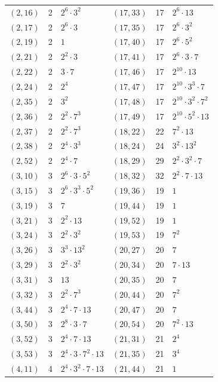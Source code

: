 \documentclass[11pt]{article}
\begin{document}
\begin{longtable}{@{}lrl@{\qquad}lrl@{}}
$(2,16)$ & 2 & $2^{6}\cdot 3^{2}$ & $(17,33)$ & 17 & $2^{6}\cdot 13$\\
$(2,17)$ & 2 & $2^{6}\cdot 3$ & $(17,35)$ & 17 & $2^{6}\cdot 3^{2}$\\
$(2,19)$ & 2 & $1$ & $(17,40)$ & 17 & $2^{6}\cdot 5^{2}$\\
$(2,21)$ & 2 & $2^{2}\cdot 3$ & $(17,41)$ & 17 & $2^{6}\cdot 3\cdot 7$\\
$(2,22)$ & 2 & $3\cdot 7$ & $(17,46)$ & 17 & $2^{10}\cdot 13$\\
$(2,24)$ & 2 & $2^{4}$ & $(17,47)$ & 17 & $2^{10}\cdot 3^{3}\cdot 7$\\
$(2,35)$ & 2 & $3^{2}$ & $(17,48)$ & 17 & $2^{10}\cdot 3^{2}\cdot 7^{2}$\\
$(2,36)$ & 2 & $2^{2}\cdot 7^{3}$ & $(17,49)$ & 17 & $2^{10}\cdot 5^{2}\cdot 13$\\
$(2,37)$ & 2 & $2^{2}\cdot 7^{3}$ & $(18,22)$ & 22 & $7^{2}\cdot 13$\\
$(2,38)$ & 2 & $2^{4}\cdot 3^{3}$ & $(18,24)$ & 24 & $3^{2}\cdot 13^{2}$\\
$(2,52)$ & 2 & $2^{4}\cdot 7$ & $(18,29)$ & 29 & $2^{2}\cdot 3^{2}\cdot 7$\\
$(3,10)$ & 3 & $2^{6}\cdot 3\cdot 5^{2}$ & $(18,32)$ & 32 & $2^{2}\cdot 7\cdot 13$\\
$(3,15)$ & 3 & $2^{6}\cdot 3^{3}\cdot 5^{2}$ & $(19,36)$ & 19 & $1$\\
$(3,19)$ & 3 & $7$ & $(19,44)$ & 19 & $1$\\
$(3,21)$ & 3 & $2^{2}\cdot 13$ & $(19,52)$ & 19 & $1$\\
$(3,24)$ & 3 & $2^{2}\cdot 3^{2}$ & $(19,53)$ & 19 & $7^{2}$\\
$(3,26)$ & 3 & $3^{3}\cdot 13^{2}$ & $(20,27)$ & 20 & $7$\\
$(3,29)$ & 3 & $2^{2}\cdot 3^{2}$ & $(20,34)$ & 20 & $7\cdot 13$\\
$(3,31)$ & 3 & $13$ & $(20,35)$ & 20 & $7$\\
$(3,32)$ & 3 & $2^{2}\cdot 7^{3}$ & $(20,44)$ & 20 & $7^{2}$\\
$(3,44)$ & 3 & $2^{4}\cdot 7\cdot 13$ & $(20,47)$ & 20 & $7$\\
$(3,50)$ & 3 & $2^{8}\cdot 3\cdot 7$ & $(20,54)$ & 20 & $7^{2}\cdot 13$\\
$(3,52)$ & 3 & $2^{4}\cdot 7\cdot 13$ & $(21,31)$ & 21 & $2^{4}$\\
$(3,53)$ & 3 & $2^{4}\cdot 3\cdot 7^{2}\cdot 13$ & $(21,35)$ & 21 & $3^{4}$\\
$(4,11)$ & 4 & $2^{4}\cdot 3^{2}\cdot 7\cdot 13$ & $(21,44)$ & 21 & $1$\\

\end{longtable}
\end{document}
